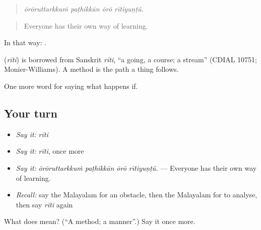 \begin{quote}
\emph{ōrōruttarkkuṁ paṭhikkān ōrō rītiyuṇṭŭ.}
\end{quote}

\begin{quote}
Everyone has their own way of learning.
\end{quote}

In that way:  .

\begin{cousinweb}
\textbf{} (\emph{rīti}) is borrowed from Sanskrit \emph{rīti}, \textquotedblleft{}a going, a course; a stream\textquotedblright{} (CDIAL 10751; Monier-Williams). A method is the path a thing follows.
\end{cousinweb}

\begin{grammarlens}[title={What you've built}]
One more word for saying what happens if.
\end{grammarlens}

\subsection*{Your turn}
\begin{itemize}
\raggedright
  \item \emph{Say it:} \emph{rīti}
  \item \emph{Say it:} \emph{rīti}, once more
  \item \emph{Say it:} \emph{ōrōruttarkkuṁ paṭhikkān ōrō rītiyuṇṭŭ.} — Everyone has their own way of learning.
  \item \emph{Recall:} say the Malayalam for an obstacle, then the Malayalam for to analyse, then say \emph{rīti} again
\end{itemize}

\begin{tcolorbox}[breakable,colback=teal!4,colframe=teal!35!black,title={Before you move on}]
What does  mean? (\textquotedblleft{}A method; a manner\textquotedblright{}.) Say it once more.
\end{tcolorbox}
